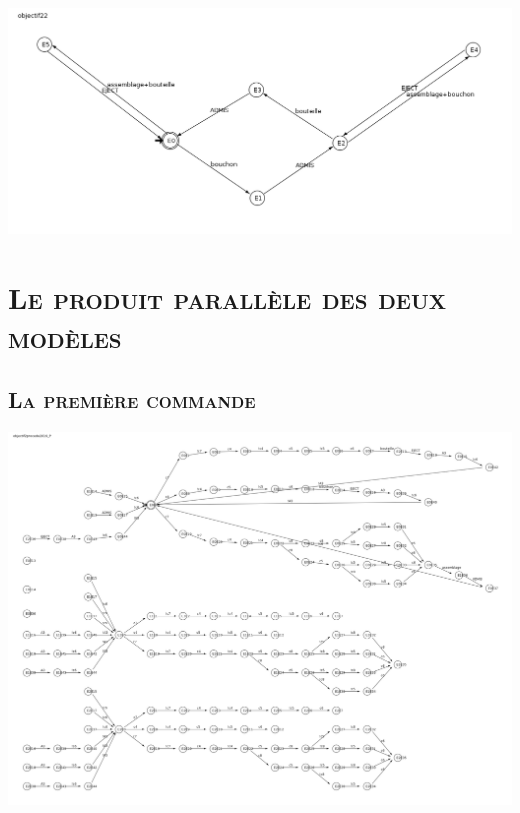 		 	\begin{center}
			\includegraphics[scale=0.4]{obj2.png}
			\label{fig5}
			\end{center} 
			
	 \pagebreak
		 \section{\textsc{Le produit parallèle des deux modèles}}

		  \subsection{\textsc{La première commande}}
		    
		  \begin{center}
			\includegraphics[scale=0.2]{com1.png}
			\label{fig6}
			\end{center}		    
		    
